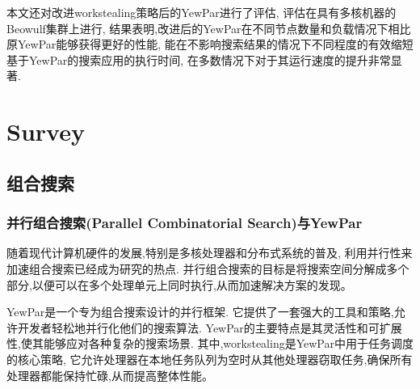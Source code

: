 \documentclass{mproj}
\begin{document}
本文还对改进workstealing策略后的YewPar进行了评估,
评估在具有多核机器的Beowulf集群上进行,
结果表明,改进后的YewPar在不同节点数量和负载情况下相比原YewPar能够获得更好的性能,
能在不影响搜索结果的情况下不同程度的有效缩短基于YewPar的搜索应用的执行时间,
在多数情况下对于其运行速度的提升非常显著.


\chapter{Survey}\label{survey}

\section{组合搜索}

\subsection{并行组合搜索(Parallel Combinatorial Search)与YewPar}
随着现代计算机硬件的发展,特别是多核处理器和分布式系统的普及,
利用并行性来加速组合搜索已经成为研究的热点.
并行组合搜索的目标是将搜索空间分解成多个部分,以便可以在多个处理单元上同时执行,从而加速解决方案的发现。

YewPar是一个专为组合搜索设计的并行框架.
它提供了一套强大的工具和策略,允许开发者轻松地并行化他们的搜索算法.
YewPar的主要特点是其灵活性和可扩展性,使其能够应对各种复杂的搜索场景.
其中,workstealing是YewPar中用于任务调度的核心策略,
它允许处理器在本地任务队列为空时从其他处理器窃取任务,确保所有处理器都能保持忙碌,从而提高整体性能。
\end{document}
